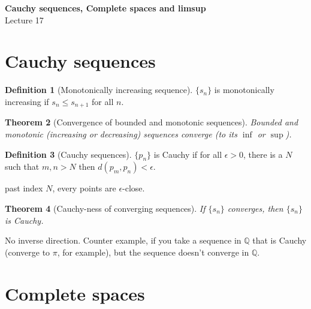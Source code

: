 \documentclass[12pt]{article}
\newcommand{\QQ}{\mathbb{Q}}   %
\theoremstyle{definition}
\newtheorem{definition}{Definition}[section]
\theoremstyle{plain}
\newtheorem{theorem}[definition]{Theorem}
\begin{document}

\begin{center}
    {\Large \textbf{Cauchy sequences, Complete spaces and limsup}}\\[0.5em]
    {\large Lecture 17}
\end{center}

\tableofcontents

\newpage

\section{Cauchy sequences}

\begin{definition}[Monotonically increasing sequence]
$\{s_n\}$ is monotonically increasing if $s_n \le s_{n+1}$ for all $n$.
\end{definition}

\begin{theorem}[Convergence of bounded and monotonic sequences]
Bounded and monotonic (increasing or decreasing) sequences converge (to its $\inf$ or $\sup$).
\end{theorem}

\begin{definition}[Cauchy sequences]
$\{p_n\}$ is Cauchy if for all $\epsilon > 0$, there is a $N$ such that $m,n > N$ then $d(p_m,p_n)<\epsilon$.
\end{definition}

\begin{note}
past index $N$, every points are $\epsilon$-close.
\end{note}

\begin{theorem}[Cauchy-ness of converging sequences]
If $\{s_n\}$ converges, then $\{s_n\}$ is Cauchy.
\end{theorem}

\begin{note}
No inverse direction. Counter example, if you take a sequence in $\QQ$ that is Cauchy (converge to $\pi$, for example), but the sequence doesn't converge in $\QQ$.
\end{note}

\section{Complete spaces}
\end{document}

